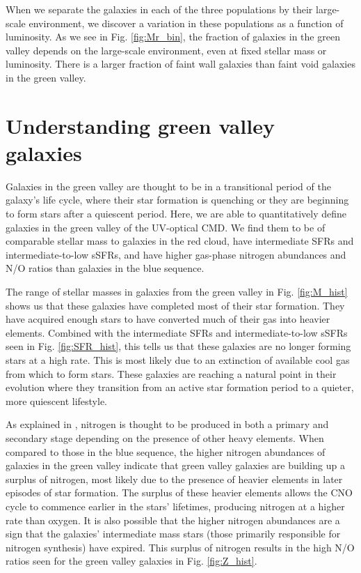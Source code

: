 When we separate the galaxies in each of the three populations by their 
large-scale environment, we discover a variation in these populations as a 
function of luminosity.  As we see in Fig. \ref{fig:Mr_bin}, the fraction of 
galaxies in the green valley depends on the large-scale environment, even at 
fixed stellar mass or luminosity.  There is a larger fraction of faint wall 
galaxies than faint void galaxies in the green valley.




\section[Understanding GV galaxies]{Understanding green valley galaxies}\label{sec:discussion_GV}

Galaxies in the green valley are thought to be in a transitional period of the 
galaxy's life cycle, where their star formation is quenching or they are 
beginning to form stars after a quiescent period.  Here, we are able to 
quantitatively define galaxies in the green valley of the UV-optical CMD.  We 
find them to be of comparable stellar mass to galaxies in the red cloud, have 
intermediate SFRs and intermediate-to-low sSFRs, and have higher gas-phase 
nitrogen abundances and N/O ratios than galaxies in the blue sequence.

The range of stellar masses in galaxies from the green valley in Fig. 
\ref{fig:M_hist} shows us that these galaxies have completed most of their star 
formation.  They have acquired enough stars to have converted much of their gas 
into heavier elements.  Combined with the intermediate SFRs and 
intermediate-to-low sSFRs seen in Fig. \ref{fig:SFR_hist}, this tells us that 
these galaxies are no longer forming stars at a high rate.  This is most likely 
due to an extinction of available cool gas from which to form stars.  These 
galaxies are reaching a natural point in their evolution where they transition 
from an active star formation period to a quieter, more quiescent lifestyle.

As explained in \cite{Douglass17b}, nitrogen is thought to be produced in both a 
primary and secondary stage depending on the presence of other heavy elements.  
When compared to those in the blue sequence, the higher nitrogen abundances of 
galaxies in the green valley indicate that green valley galaxies are building up 
a surplus of nitrogen, most likely due to the presence of heavier elements in 
later episodes of star formation.  The surplus of these heavier elements allows 
the CNO cycle to commence earlier in the stars' lifetimes, producing nitrogen at 
a higher rate than oxygen.  It is also possible that the higher nitrogen 
abundances are a sign that the galaxies' intermediate mass stars (those 
primarily responsible for nitrogen synthesis) have expired.  This surplus of 
nitrogen results in the high N/O ratios seen for the green valley galaxies in 
Fig. \ref{fig:Z_hist}.

